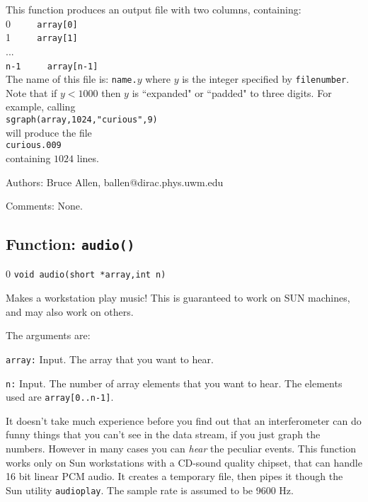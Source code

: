 This function produces an output file with two columns, containing:\\
0 $\qquad$ {\tt array[0]}\\
1 $\qquad$ {\tt array[1]}\\
...\\
{\tt n-1} $\qquad$ {\tt array[n-1]}\\
The name of this file is:
{\tt name.$y$} where $y$ is the integer specified by {\tt filenumber}.
Note that if $y<1000$ then $y$ is ``expanded" or ``padded" to three
digits.  For example, calling\\
{\tt sgraph(array,1024,"curious",9)}\\
will produce the file\\
{\tt curious.009}\\
containing $1024$ lines.
\begin{description}
\item{Authors:}
Bruce Allen, ballen@dirac.phys.uwm.edu
\item{Comments:}
None.
\end{description}
\clearpage



\subsection{Function: {\tt audio()}}
\setcounter{equation}0
{\tt void audio(short *array,int n)}

Makes a workstation play music!  This is guaranteed to work on SUN
machines, and may also work on others.

The arguments are:
\begin{description}
\item{\tt array:} Input.  The array that you want to hear.
\item{\tt n:} Input.  The number of array elements that you want to hear.
  The elements used are {\tt array[0..n-1]}. 
\end{description}

It doesn't take much experience before you find out that an interferometer
can do funny things that you can't see in the data stream, if you just
graph the numbers.  However in many cases you can {\it hear}
the peculiar events.  This function works only on Sun workstations with
a CD-sound quality chipset, that can handle 16 bit linear PCM audio.
It creates a temporary file, then pipes it though the Sun utility
{\tt audioplay}.  The sample rate is assumed to be 9600 Hz.

